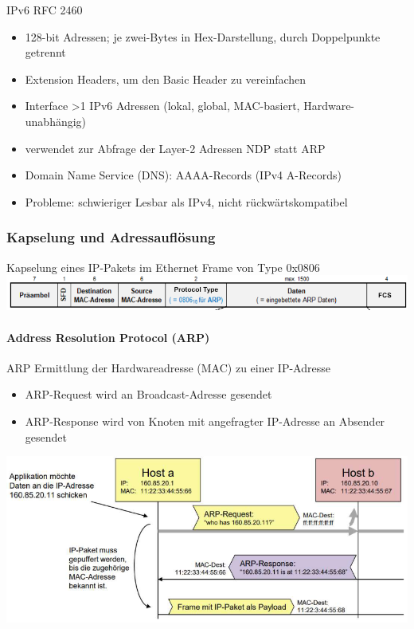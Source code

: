 \begin{definition}{IPv6} RFC 2460
    \begin{itemize}
        \item 128-bit Adressen; je zwei-Bytes in Hex-Darstellung, durch Doppelpunkte getrennt
        \item Extension Headers, um den Basic Header zu vereinfachen
        \item Interface >1 IPv6 Adressen (lokal, global, MAC-basiert, Hardware-unabhängig)
        \item verwendet zur Abfrage der Layer-2 Adressen NDP statt ARP
        \item Domain Name Service (DNS): AAAA-Records (IPv4 A-Records)
        \item Probleme: schwieriger Lesbar als IPv4, nicht rückwärtskompatibel
    \end{itemize}
\end{definition}

\columnbreak

\subsubsection{Kapselung und Adressauflösung}

\begin{definition}{Kapselung eines IP-Pakets im Ethernet Frame} von Type 0x0806\\
        \includegraphics[width=1\linewidth]{images/kapselung_ip_paket.png}
\end{definition}



\paragraph*{Address Resolution Protocol (ARP)}

\begin{concept}{ARP}
    Ermittlung der Hardwareadresse (MAC) zu einer IP-Adresse
    \begin{itemize}
        \item ARP-Request wird an Broadcast-Adresse gesendet
        \item ARP-Response wird von Knoten mit angefragter IP-Adresse an Absender gesendet
    \end{itemize}
        \includegraphics[width=1\linewidth]{images/arp_concept.png}
\end{concept}

